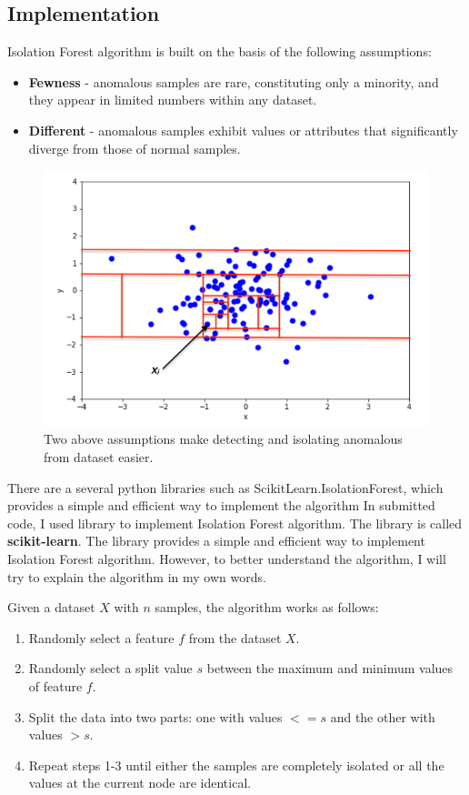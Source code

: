 \subsection{Implementation}
Isolation Forest algorithm is built on the basis of the following assumptions:
\begin{itemize}
    \item \textbf{Fewness} - anomalous samples are rare, constituting only a minority, and they appear in limited numbers within any dataset.
    \item \textbf{Different} - anomalous samples exhibit values or attributes that significantly diverge from those of normal samples.
\end{itemize}

\begin{figure}[H]
  \centering
  \includegraphics[width=\linewidth]{body/02_methodology/img/figure5.png}
  \caption{Two above assumptions make detecting and isolating anomalous from dataset easier.}
\end{figure}


There are a several python libraries such as ScikitLearn.IsolationForest, which provides a simple and efficient way to implement the algorithm
In submitted code, I used library to implement Isolation Forest algorithm. The library is called \textbf{scikit-learn}. The library provides a simple and efficient way to implement Isolation Forest algorithm. However, to better understand the algorithm, I will try to explain the algorithm in my own words. 

\newpage
Given a dataset $X$ with $n$ samples, the algorithm works as follows:

\begin{enumerate}
    \item Randomly select a feature $f$ from the dataset $X$.
    \item Randomly select a split value $s$ between the maximum and minimum values of feature $f$.
    \item Split the data into two parts: one with values $<= s$ and the other with values $> s$.
    \item Repeat steps 1-3 until either the samples are completely isolated or all the values at the current node are identical.
\end{enumerate}

